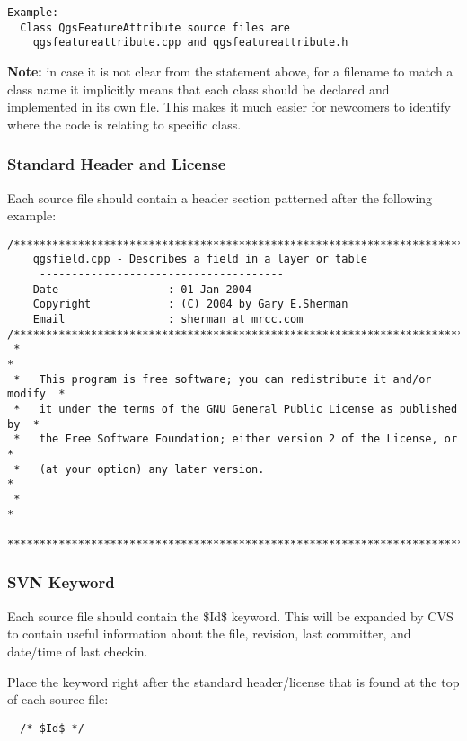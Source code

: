 \begin{verbatim}
Example:
  Class QgsFeatureAttribute source files are 
    qgsfeatureattribute.cpp and qgsfeatureattribute.h
\end{verbatim}

\textbf{Note:} in case it is not clear from the statement above, for a filename 
to match a class name it implicitly means that each class should be declared 
and implemented in its own file. This makes it much easier for newcomers to 
identify where the code is relating to specific class.

\subsubsection{Standard Header and License}
Each source file should contain a header section patterned after the following
example:

\begin{verbatim}
/***************************************************************************
    qgsfield.cpp - Describes a field in a layer or table
     --------------------------------------
    Date                 : 01-Jan-2004
    Copyright            : (C) 2004 by Gary E.Sherman
    Email                : sherman at mrcc.com
/***************************************************************************
 *                                                                         *
 *   This program is free software; you can redistribute it and/or modify  *
 *   it under the terms of the GNU General Public License as published by  *
 *   the Free Software Foundation; either version 2 of the License, or     *
 *   (at your option) any later version.                                   *
 *                                                                         *
 ***************************************************************************/
\end{verbatim}

\subsubsection{SVN Keyword}
Each source file should contain the \$Id\$ keyword. This will be expanded by CVS
to contain useful information about the file, revision, last committer, and
date/time of last checkin.

Place the keyword right after the standard header/license that is found at the
top of each source file:

\begin{verbatim}
  /* $Id$ */
\end{verbatim}

